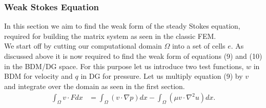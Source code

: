 \documentclass[11pt,twoside,a4paper]{article}
\begin{document}
\subsubsection{Weak Stokes Equation}
In this section we aim to find the weak form of the steady Stokes equation, required for building the matrix system as seen in the classic FEM.\\
We start off by cutting our computational domain $\Omega$ into a set of cells $e$. As discussed above it is now required to find the weak form of equations (9) and (10) in the BDM/DG space.
For this purpose let us introduce two test functions, $w$ in BDM for velocity and $q$ in DG for pressure.
Let us multiply equation (9) by $v$ and integrate over the domain as seen in the first section.
\begin{align*}
\int_\Omega v \cdot F dx &= \int_\Omega (v \cdot \nabla p) dx - \int_\Omega (\mu v \cdot \nabla^2 u) dx .
\end{align*}
\end{document}
